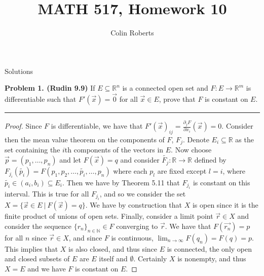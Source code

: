 \documentclass[leqno]{article}
\author{Colin Roberts}
\title{MATH 517, Homework 10}
\theoremstyle{nonumberplain}
\newtheorem{proof}{Proof}
\newcommand{\R}{\mathbb{R}}
\newcommand{\N}{\mathbb{N}}
\begin{document}
\maketitle
\begin{large}
\begin{center}
Solutions
\end{center}
\end{large}
\pagebreak


\noindent\textbf{Problem 1. (Rudin 9.9)} If $E \subseteq \R^n$ is a connected open set and $F\colon E \to \R^m$ is differentiable such that $F'(\vec{x})=\vec{0}$ for all $\vec{x}\in E$, prove that $F$ is constant on $E$.

\noindent\rule[0.5ex]{\linewidth}{1pt}

\begin{proof}
Since $F$ is differentiable, we have that $F'(\vec{x})_{ij}=\frac{\partial_j F}{\partial x_i} (\vec{x})=0$.  Consider then the mean value theorem on the components of $F$, $F_j$.  Denote $E_i\subseteq \R$ as the set containing the $i$th components of the vectors in $E$. Now choose $\vec{p}=(p_1,\dots,p_n)$ and let $F(\vec{x})=q$ and consider $\tilde{F_j}\colon \R \to \R$ defined by $F_{j_i}(\tilde{p_i})=F(p_1,p_2,\dots,\tilde{p_i},\dots,p_n)$ where each $p_l$ are fixed except $l=i$, where $\tilde{p_i}\in (a_i,b_i)\subseteq E_i$. Then we have by Theorem 5.11 that $F_{j_i}$ is constant on this interval. This is true for all $F_{j_i}$, and so we consider the set $X=\{\vec{x}\in E ~\vert~ F(\vec{x})=q\}$.  We have by construction that $X$ is open since it is the finite product of unions of open sets.  Finally, consider a limit point $\vec{r}\in X$ and consider the sequence $\{r_n\}_{n\in \N}\in F$ converging to $\vec{r}$.  We have that $F(\vec{r_n})=p$ for all $n$ since $\vec{r}\in X$, and since $F$ is continuous, $\lim_{n\to \infty} F(q_n)=F(q)=p$.  This implies that $X$ is also closed, and thus since $E$ is connected, the only open and closed subsets of $E$ are $E$ itself and $\emptyset$. Certainly $X$ is nonempty, and thus $X=E$ and we have $F$ is constant on $E$.
\end{proof}
\end{document}

